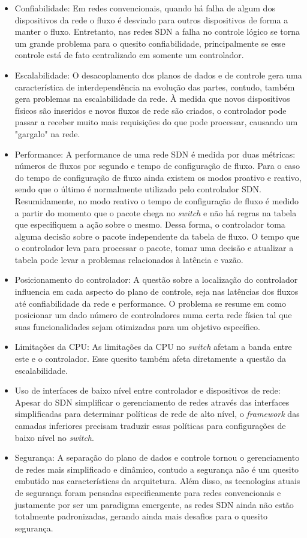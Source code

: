 \begin{itemize}
    \item Confiabilidade: Em redes convencionais, quando há falha de algum dos dispositivos da rede o fluxo é desviado para outros dispositivos de forma a manter o fluxo. Entretanto, nas redes SDN a falha no controle lógico se torna um grande problema para o quesito confiabilidade, principalmente se esse controle está de fato centralizado em somente um controlador. 
    \item Escalabilidade: O desacoplamento dos planos de dados e de controle gera uma característica de interdependência na evolução das partes, contudo, também gera problemas na escalabilidade da rede. À medida que novos dispositivos físicos são inseridos e novos fluxos de rede são criados, o controlador pode passar a receber muito mais requisições do que pode processar, causando um "gargalo" na rede.
    \item Performance: A performance de uma rede SDN é medida por duas métricas: números de fluxos por segundo e tempo de configuração de fluxo. Para o caso do tempo de configuração de fluxo ainda existem os modos proativo e reativo, sendo que o último é normalmente utilizado pelo controlador SDN. Resumidamente, no modo reativo o tempo de configuração de fluxo é medido a partir do momento que o pacote chega no \emph{switch} e não há regras na tabela que especifiquem a ação sobre o mesmo. Dessa forma, o controlador toma alguma decisão sobre o pacote independente da tabela de fluxo. O tempo que o controlador leva para processar o pacote, tomar uma decisão e atualizar a tabela pode levar a problemas relacionados à latência e vazão.
    \item Posicionamento do controlador: A questão sobre a localização do controlador influencia em cada aspecto do plano de controle, seja nas latências dos fluxos até confiabilidade da rede e performance. O problema se resume em como posicionar um dado número de controladores numa certa rede física tal que suas funcionalidades sejam otimizadas para um objetivo específico.
    \item Limitações da CPU: As limitações da CPU no \emph{switch} afetam a banda entre este e o controlador. Esse quesito também afeta diretamente a questão da escalabilidade.
    \item Uso de interfaces de baixo nível entre controlador e dispositivos de rede: Apesar do SDN simplificar o gerenciamento de redes através das interfaces simplificadas para determinar políticas de rede de alto nível, o \emph{framework} das camadas inferiores precisam traduzir essas políticas para configurações de baixo nível no \emph{switch}.
    \item Segurança: A separação do plano de dados e controle tornou o gerenciamento de redes mais simplificado e dinâmico, contudo a segurança não é um quesito embutido nas características da arquitetura. Além disso, as tecnologias atuais de segurança foram pensadas especificamente para redes convencionais e justamente por ser um paradigma emergente, as redes SDN ainda não estão totalmente padronizadas, gerando ainda mais desafios para o quesito segurança.
    
\end{itemize}
